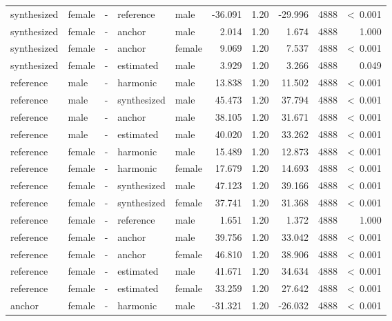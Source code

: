 \documentclass[a4paper,man,hidelinks,floatsintext]{apa7}
\begin{document}
\begin{table}[!htbp]
\begin{adjustbox}{max size={\columnwidth}{\textheight}}
\begin{tabular}{llrllrrrrr}
synthesized & female & - & reference   & male   &    -36.091 & 1.20 & -29.996 & 4888 &  \textless~0.001 \\
synthesized & female & - & anchor      & male   &      2.014 & 1.20 &   1.674 & 4888 &            1.000 \\
synthesized & female & - & anchor      & female &      9.069 & 1.20 &   7.537 & 4888 &  \textless~0.001 \\
synthesized & female & - & estimated   & male   &      3.929 & 1.20 &   3.266 & 4888 &            0.049 \\
reference   & male   & - & harmonic    & male   &     13.838 & 1.20 &  11.502 & 4888 &  \textless~0.001 \\
reference   & male   & - & synthesized & male   &     45.473 & 1.20 &  37.794 & 4888 &  \textless~0.001 \\
reference   & male   & - & anchor      & male   &     38.105 & 1.20 &  31.671 & 4888 &  \textless~0.001 \\
reference   & male   & - & estimated   & male   &     40.020 & 1.20 &  33.262 & 4888 &  \textless~0.001 \\
reference   & female & - & harmonic    & male   &     15.489 & 1.20 &  12.873 & 4888 &  \textless~0.001 \\
reference   & female & - & harmonic    & female &     17.679 & 1.20 &  14.693 & 4888 &  \textless~0.001 \\
reference   & female & - & synthesized & male   &     47.123 & 1.20 &  39.166 & 4888 &  \textless~0.001 \\
reference   & female & - & synthesized & female &     37.741 & 1.20 &  31.368 & 4888 &  \textless~0.001 \\
reference   & female & - & reference   & male   &      1.651 & 1.20 &   1.372 & 4888 &            1.000 \\
reference   & female & - & anchor      & male   &     39.756 & 1.20 &  33.042 & 4888 &  \textless~0.001 \\
reference   & female & - & anchor      & female &     46.810 & 1.20 &  38.906 & 4888 &  \textless~0.001 \\
reference   & female & - & estimated   & male   &     41.671 & 1.20 &  34.634 & 4888 &  \textless~0.001 \\
reference   & female & - & estimated   & female &     33.259 & 1.20 &  27.642 & 4888 &  \textless~0.001 \\
anchor      & female & - & harmonic    & male   &    -31.321 & 1.20 & -26.032 & 4888 &  \textless~0.001 \\

\end{tabular}
\end{adjustbox}
\end{table}
\end{document}
